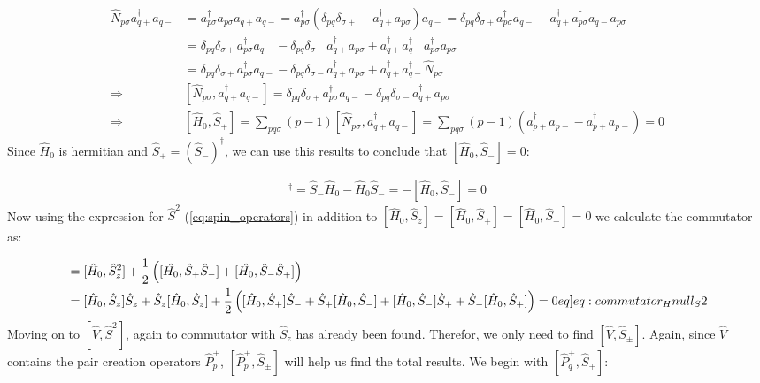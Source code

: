 \documentclass{article}
\newcommand{\crt}[1]{a_{#1}^{\dagger}}
\newcommand{\ani}[1]{a_{#1}}
\newcommand{\spinop}[1]{\hat{S}_{#1}}
\newcommand{\pplus}[1]{\hat{P}_{#1}^{+}}
\newcommand{\numberop}[1]{\hat{N}_{#1}}
\begin{document}
\begin{align*}
    \numberop{p\sigma}\crt{q+}\ani{q-} &= \crt{p\sigma}\ani{p\sigma}\crt{q+}\ani{q-} = \crt{p\sigma}(\delta_{pq}\delta_{\sigma+} - \crt{q+}\ani{p\sigma})\ani{q-} = \delta_{pq}\delta_{\sigma+} \crt{p\sigma}\ani{q-} - \crt{q+}\crt{p\sigma}\ani{q-}\ani{p\sigma} \\
    &= \delta_{pq}\delta_{\sigma+} \crt{p\sigma}\ani{q-} - \delta_{pq}\delta_{\sigma-} \crt{q+}\ani{p\sigma} + \crt{q+}\crt{q-}\crt{p\sigma}\ani{p\sigma} \\
    &= \delta_{pq}\delta_{\sigma+} \crt{p\sigma}\ani{q-} - \delta_{pq}\delta_{\sigma-} \crt{q+}\ani{p\sigma} + \crt{q+}\crt{q-}\numberop{p\sigma} \\
    \Rightarrow& [\numberop{p\sigma}, \crt{q+}\ani{q-}] = \delta_{pq}\delta_{\sigma+} \crt{p\sigma}\ani{q-} - \delta_{pq}\delta_{\sigma-} \crt{q+}\ani{p\sigma} \\
    \Rightarrow& [\hat{H}_0, \spinop{+}] = \sum_{pq\sigma} (p-1) [\numberop{p\sigma}, \crt{q+}\ani{q-}] = \sum_{pq\sigma} (p-1)(\crt{p+}\ani{p-}-\crt{p+}\ani{p-}) = 0
\end{align*}
Since $\hat{H}_0$ is hermitian and $\spinop{+} = (\spinop{-})^\dagger$, we can use this results to conclude that $[\hat{H}_0, \spinop{-}] = 0$:

\begin{align*}
    [\hat{H}_0, \spinop{+}]^\dagger = \spinop{-}\hat{H}_0 - \hat{H}_0 \spinop{-} = -[\hat{H}_0, \spinop{-}] = 0
\end{align*}
Now using the expression for $\spinop{}^2$ (\cref{eq:spin_operators}) in addition to $[\hat{H}_0, \spinop{z}] = [\hat{H}_0, \spinop{+}] = [\hat{H}_0, \spinop{-}] = 0$ we calculate the commutator as:

\begin{align}
    [\hat{H}_0, \spinop{}^2] &= [\hat{H}_0, \spinop{z}^2] + \frac{1}{2}\left( [\hat{H_0}, \spinop{+}\spinop{-}] + [\hat{H_0}, \spinop{-}\spinop{+}]\right) \nonumber\\
    &= [\hat{H}_0, \spinop{z}]\spinop{z} + \spinop{z}[\hat{H}_0, \spinop{z}] + \frac{1}{2}\left( [\hat{H}_0, \spinop{+}]\spinop{-} + \spinop{+}[\hat{H}_0, \spinop{-}] + [\hat{H}_0, \spinop{-}]\spinop{+} + \spinop{-}[\hat{H}_0, \spinop{+}] \right) = 0 \label[eq]{eq:commutator_Hnull_S2}
\end{align}
Moving on to $[\hat{V}, \spinop{}^2]$, again to commutator with $\spinop{z}$ has already been found. Therefor, we only need to find $[\hat{V}, \spinop{\pm}]$. Again, since $\hat{V}$ contains the pair creation operators $\hat{P}_p^{\pm}$, $[\hat{P}_p^{\pm}, \spinop{\pm}]$ will help us find the total results. We begin with $[\pplus{q}, \spinop{+}]$:
\end{document}

